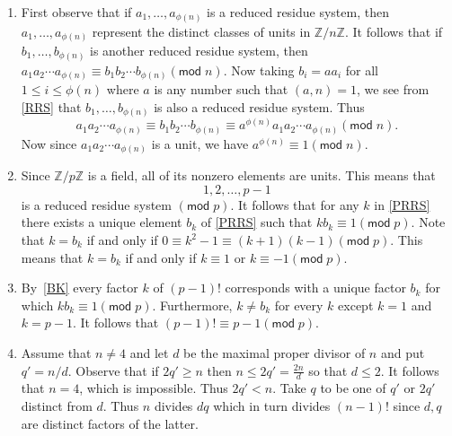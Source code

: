 \documentclass[12pt]{article}
\renewcommand{\pmod}[1]{\left(\mathsf{mod}\;#1\right)}
\begin{document}
\begin{enumerate}
\item %
First observe that if $a_1,\ldots,a_{\phi\left(n\right)}$
is a reduced residue system, then 
$a_1,\ldots,a_{\phi\left(n\right)}$ represent the distinct
classes of units in $\mathbb{Z}/n\mathbb{Z}$.
It follows that if $b_1,\ldots,b_{\phi\left(n\right)}$
is another reduced residue system, then
$a_1a_2\cdots a_{\phi\left(n\right)}
\equiv b_1b_2\cdots b_{\phi\left(n\right)}\pmod{n}$.
Now taking $b_i=aa_i$ for all $1\le i\le\phi\left(n\right)$
where $a$ is any number such that $\left(a,n\right)=1$,
we see from \autoref{RRS} that
$b_1,\ldots,b_{\phi\left(n\right)}$
is also a reduced residue system. Thus
\[a_1a_2\cdots a_{\phi\left(n\right)}
\equiv b_1b_2\cdots b_{\phi\left(n\right)}\equiv
a^{\phi\left(n\right)}a_1a_2\cdots a_{\phi\left(n\right)}
\pmod{n}.\]
Now since
$a_1a_2\cdots a_{\phi\left(n\right)}$ is a unit, we have
$a^{\phi\left(n\right)}\equiv 1\pmod{n}$.

\item\label{BK} %
Since $\mathbb{Z}/p\mathbb{Z}$ is a field, all of its
nonzero elements are units. This means that
\begin{equation}\label{PRRS}
1,2,\ldots,p-1
\end{equation}
is a reduced residue system $\pmod{p}$. It follows
that for any $k$ in \autoref{PRRS} there exists
a unique element $b_k$ of \autoref{PRRS} such that
$kb_k\equiv 1\pmod{p}$.
Note that $k=b_k$ if and only if $0\equiv k^2-1\equiv
\left(k+1\right)\left(k-1\right)\pmod{p}$.
This means that $k=b_k$ if and only if $k\equiv 1$
or $k\equiv -1\pmod{p}$.

\item %
By~\autoref{BK} every factor $k$ of $\left(p-1\right)!$ corresponds
with a unique factor $b_k$ for which $kb_k\equiv 1\pmod{p}$.
Furthermore, $k\ne b_k$ for every $k$ except $k=1$ and $k=p-1$.
It follows that $\left(p-1\right)!\equiv p-1\pmod{p}$.

\item %
Assume that $n\ne 4$ and
let $d$ be the maximal proper divisor of $n$ and put $q'=n/d$.
Observe that if $2q'\ge n$ then
$n\le 2q'=\frac{2n}{d}$ so that $d\le 2$. It follows that $n=4$,
which is impossible. Thus $2q'<n$. Take $q$ to be one
of $q'$ or $2q'$ distinct from $d$. Thus $n$ divides
$dq$ which in turn divides $\left(n-1\right)!$ since $d,q$ are distinct
factors of the latter.


\end{enumerate}
\end{document}
